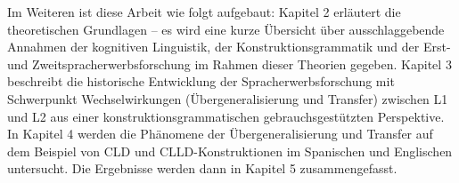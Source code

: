 Im Weiteren ist diese Arbeit wie folgt aufgebaut:
Kapitel 2 erläutert die theoretischen Grundlagen -- es wird eine kurze Übersicht über ausschlaggebende Annahmen der kognitiven Linguistik, der Konstruktionsgrammatik und der Erst- und Zweitspracherwerbsforschung im Rahmen dieser Theorien gegeben.
Kapitel 3 beschreibt die historische Entwicklung der Spracherwerbsforschung mit Schwerpunkt Wechselwirkungen (Übergeneralisierung und Transfer) zwischen L1 und L2 aus einer konstruktionsgrammatischen gebrauchsgestützten Perspektive.
In Kapitel 4 werden die Phänomene der Übergeneralisierung und Transfer auf dem Beispiel von CLD und CLLD-Konstruktionen im Spanischen und Englischen untersucht.
Die Ergebnisse werden dann in Kapitel 5 zusammengefasst. %

